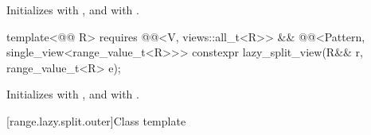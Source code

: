 \begin{itemdescr}
\pnum
\effects
Initializes  with , and
 with .
\end{itemdescr}

%
\begin{itemdecl}
template<@@ R>
  requires @@<V, views::all_t<R>> &&
           @@<Pattern, single_view<range_value_t<R>>>
constexpr lazy_split_view(R&& r, range_value_t<R> e);
\end{itemdecl}

\begin{itemdescr}
\pnum
\effects
Initializes  with , and
 with .
\end{itemdescr}

[range.lazy.split.outer]{Class template }

